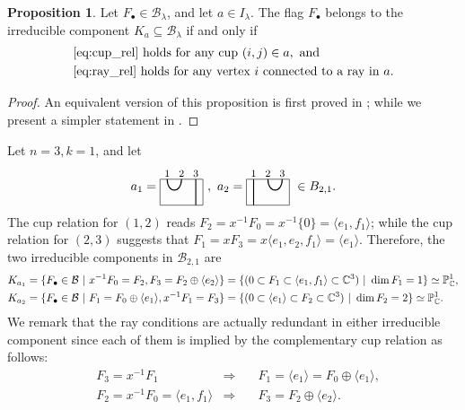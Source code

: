 \documentclass[11pt,reqno]{amsart}
\numberwithin{equation}{section}
\theoremstyle{definition}
\newtheorem{proposition}[theorem]{Proposition}
\def\<{\langle}
\def\>{\rangle}
\newcommand{\cB}{\mathcal{B}}
\newcommand{\CP}{\mathbb{P}_\mathbb{C}}
\newcommand{\inv}{^{-1}}
\newcommand{\ld}{\lambda}
\newcommand{\cupa}{\begin{tikzpicture}[baseline={(0,-.3)}, scale = 0.8]
\draw(-.25,0) -- (1.25,0) -- (1.25,-.9) -- (-.25,-.9) -- cycle;
\begin{footnotesize}
\node at (0,.2) {$1$};
\node at (.5,.2) {$2$};
\node at (1,.2) {$3$};
\end{footnotesize}
\draw[thick] (0,0) .. controls +(0,-.5) and +(0,-.5) .. +(.5,0);

\draw[thick] (1,0) -- +(0,-.9);
\end{tikzpicture}
}
\newcommand{\cupb}{\begin{tikzpicture}[baseline={(0,-.3)}, scale = 0.8]
\draw(-.25,0) -- (1.25,0) -- (1.25,-.9) -- (-.25,-.9) -- cycle;
\begin{footnotesize}
\node at (0,.2) {$1$};
\node at (.5,.2) {$2$};
\node at (1,.2) {$3$};
\end{footnotesize}
\draw[thick] (0.5,0) .. controls +(0,-.5) and +(0,-.5) .. +(.5,0);

\draw[thick] (0,0) -- +(0,-.9);
\end{tikzpicture}
}
\begin{document}
\begin{proposition}\label{prop:known_results_about_irred_comp}
Let $F_\bullet \in \cB_{\ld}$, and let $a \in I_{\ld}$.
The flag $F_\bullet$ belongs to the irreducible component $K_a\subseteq \mathcal B_\ld$  if and only if
\[
\begin{split}
&\eqref{eq:cup_rel}\textup{ holds for any cup }(i,j) \in a,
\textup{ and}
\\
&\eqref{eq:ray_rel}\textup{ holds for any vertex }i \textup{ connected to a  ray in }a.
\end{split}
\]
\end{proposition}
\begin{proof}
An equivalent version of this proposition is first proved in \cite[Theorem~5.2]{Fun03}; while we present a simpler statement in  \cite[Proposition~7]{SW12}.
\end{proof}
\ex\label{ex:Ka21}
Let $n=3, k=1$, and let
\[
a_1 = \cupa~,~ a_2 = \cupb~ \in B_{2,1}. 
\]
The cup relation for $(1,2)$ reads $F_2 = x\inv F_0 = x\inv \{0\} = \<e_1, f_1\>$; while the cup relation for $(2,3)$ suggests that $F_1 = x F_3 = x\<e_1, e_2, f_1\> = \<e_1\>$. 
Therefore, the two irreducible components in $\cB_{2,1}$ are  
\[
\begin{split}
&K_{a_1} 
= \{ F_\bullet \in \cB ~|~ x\inv F_0 = F_2, F_3 = F_2 \oplus \< e_2\>\}
= \{(0 \subset F_1 \subset \<e_1, f_1\> \subset \CC^3) ~|~ \dim F_1 = 1\} \simeq \CP^1,
\\
&K_{a_2} = \{F_\bullet \in \cB~|~ F_1 = F_0 \oplus \< e_1\>, x\inv F_1 = F_3\}
= \{(0 \subset \<e_1\> \subset F_2 \subset \CC^3) ~|~ \dim F_2 = 2\}\simeq \CP^1.
\end{split}
\]
We remark that the ray conditions are actually redundant in either irreducible component since each of them is implied by the complementary cup relation as follows:
\begin{align}
&F_3 = x\inv F_1
&\Rightarrow &\quad F_1 = \<e_1\> = F_0 \oplus \<e_1\>,
\\
&F_2 = x\inv F_0 = \<e_1,  f_1\> 
&\Rightarrow &\quad F_3 = F_2 \oplus \<e_2\>.
\end{align}
\endex
\end{document}
